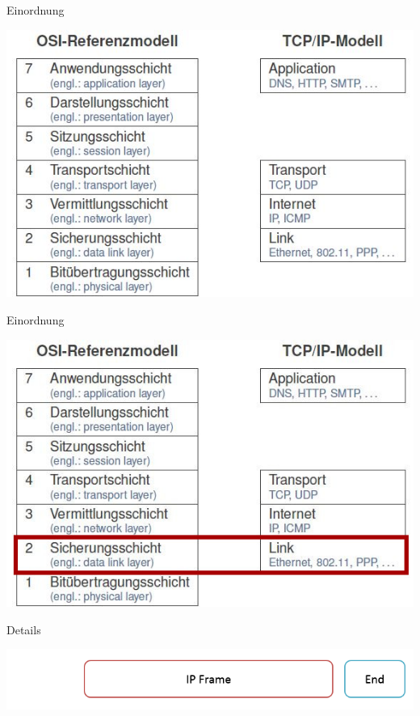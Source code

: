 \documentclass[beamer]{uibk}
\begin{document}
\begin{frame}{Einordnung}
  \begin{center}
  \includegraphics[width=\textwidth,height=\textheight,keepaspectratio]{layer.jpg}
  \end{center}
\end{frame}

\begin{frame}{Einordnung}
  \begin{center}
  \includegraphics[width=\textwidth,height=\textheight,keepaspectratio]{layer2.jpg}
  \end{center}
\end{frame}

\begin{frame}{Details}
  \newpage
  \begin{center}
  \includegraphics[width=\textwidth,height=\textheight,keepaspectratio]{ip1.png}
  \end{center}
\end{frame}
\end{document}
